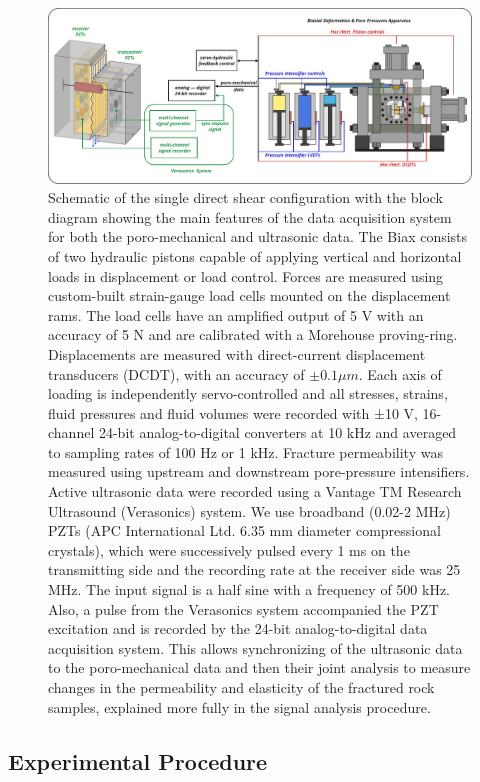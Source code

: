 \documentclass[letterpaper,10pt]{article}
\begin{document}
\begin{figure}[ht]
	\centering
	\includegraphics[width=0.9 \columnwidth]{exp_daq_v1}
	\caption[]{Schematic of the single direct shear configuration with the block diagram showing the main features of the data acquisition system for both the poro-mechanical and ultrasonic data. The Biax consists of two hydraulic pistons capable of applying vertical and horizontal loads in displacement or load control. Forces are measured using custom-built strain-gauge load cells mounted on the displacement rams. The load cells have an amplified output of 5 V with an accuracy of 5 N and are calibrated with a Morehouse proving-ring. Displacements are measured with direct-current displacement transducers (DCDT), with an accuracy of $\pm 0.1 \mu m$. Each axis of loading is independently servo-controlled and all stresses, strains, fluid pressures and fluid volumes were recorded with ±10 V, 16-channel 24-bit analog-to-digital converters at 10 kHz and averaged to sampling rates of 100 Hz or 1 kHz. Fracture permeability was measured using upstream and downstream pore-pressure intensifiers. Active ultrasonic data were recorded using a Vantage TM Research Ultrasound (Verasonics) system. We use broadband (0.02-2 MHz) PZTs (APC International Ltd. 6.35 mm diameter compressional crystals), which were successively pulsed every 1 ms on the transmitting side and the recording rate at the receiver side was 25 MHz. The input signal is a half sine with a frequency of 500 kHz. Also, a pulse from the Verasonics system accompanied the PZT excitation and is recorded by the 24-bit analog-to-digital data acquisition system. This allows synchronizing of the ultrasonic data to the poro-mechanical data and then their joint analysis to measure changes in the permeability and elasticity of the fractured rock samples, explained more fully in the signal analysis procedure.}
	\label{fig:data_aq}
\end{figure}

\newpage


\subsection{Experimental Procedure}
\end{document}
